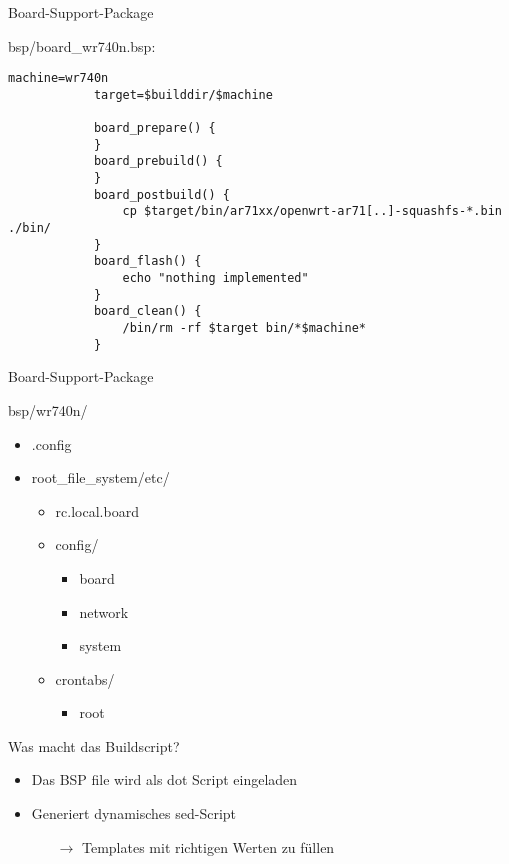 \begin{frame}[fragile]{Board-Support-Package}
    \begin{block}{bsp/board\_wr740n.bsp:}
        \scriptsize
        \begin{lstlisting}[gobble=12]
            machine=wr740n
            target=$builddir/$machine

            board_prepare() {
            }
            board_prebuild() {
            }
            board_postbuild() {
                cp $target/bin/ar71xx/openwrt-ar71[..]-squashfs-*.bin ./bin/
            }
            board_flash() {
                echo "nothing implemented"
            }
            board_clean() {
                /bin/rm -rf $target bin/*$machine*
            }
        \end{lstlisting}
    \end{block}
\end{frame}

\begin{frame}{Board-Support-Package}
    \begin{block}{bsp/wr740n/}
        \begin{itemize}
            \item .config
            \item root\_file\_system/etc/
            \begin{itemize}
                \item rc.local.board
                \item config/
                \begin{itemize}
                    \item board
                    \item network
                    \item system
                \end{itemize}
                \item crontabs/
                \begin{itemize}
                    \item root
                \end{itemize}
            \end{itemize}
        \end{itemize}
    \end{block}
\end{frame}

\begin{frame}{Was macht das Buildscript?}
    \begin{itemize}
        \item Das BSP file wird als dot Script eingeladen
        \item Generiert dynamisches sed-Script
        \begin{itemize}
            \item[$\rightarrow$] Templates mit richtigen Werten zu füllen
        \end{itemize}
    \end{itemize}
\end{frame}

